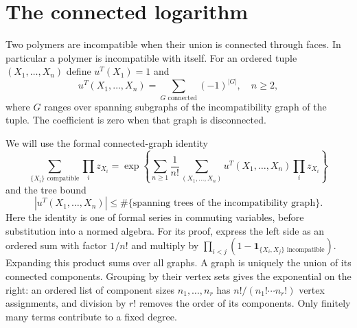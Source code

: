 \section{The connected logarithm}
\label{subsec:rgnl-cluster-logarithm}

Two polymers are incompatible when their union is connected
through faces. In particular a polymer is incompatible with
itself. For an ordered tuple $(X_1,\ldots,X_n)$ define
$u^T(X_1)=1$ and
\[
 u^T(X_1,\ldots,X_n)=\sum_{G\text{ connected}}
                                      (-1)^{|G|},\quad n\ge2,
\]
where $G$ ranges over spanning subgraphs of the incompatibility
graph of the tuple. The coefficient is zero when that graph
is disconnected.

We will use the formal connected-graph identity
\begin{equation}\label{eq:rgnl-connected-graph-identity}
 \sum_{\{X_i\}\text{ compatible}}\prod_i z_{X_i}
 =\exp\left\{\sum_{n\ge1}\frac1{n!}
       \sum_{(X_1,\ldots,X_n)}u^T(X_1,\ldots,X_n)
                                           \prod_i z_{X_i}\right\}
\end{equation}
and the tree bound
\begin{equation}\label{eq:rgnl-tree-domination}
 |u^T(X_1,\ldots,X_n)|
       \le\#\{\text{spanning trees of the incompatibility graph}\}.
\end{equation}
Here the identity is one of formal series in commuting
variables, before substitution into a normed algebra.
For its proof, express the left side as an ordered sum with
factor $1/n!$ and multiply by
$\prod_{i<j}(1-\mathbf1_{\{X_i,X_j\}\text{ incompatible}})$.
Expanding this product sums over all graphs. A graph is
uniquely the union of its connected components. Grouping by
their vertex sets gives the exponential on the right:
an ordered list of component sizes $n_1,\ldots,n_r$ has
$n!/(n_1!\cdots n_r!)$ vertex assignments, and division
by $r!$ removes the order of its components.
Only finitely many terms contribute to a fixed degree.

